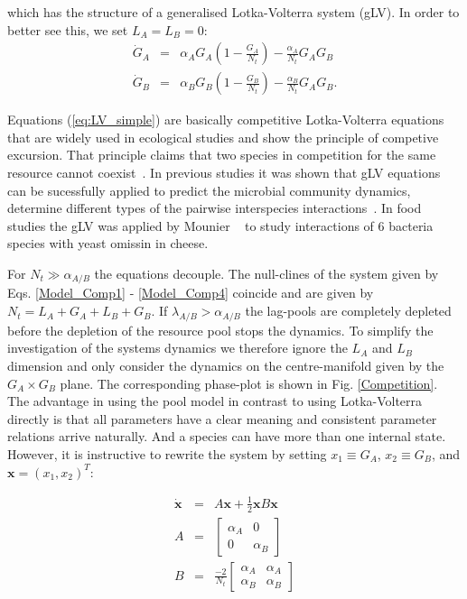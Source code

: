 \documentclass[10pt,A4paper]{article}
\begin{document}
which has the structure of a generalised Lotka-Volterra system (gLV). 
In order to better see this, we set $L_A=L_B=0$: 
\begin{eqnarray}
\label{Comp_Model}
\dot{G}_A &=& \alpha_A G_A\left(1 - \frac{G_A}{N_t}\right ) - \frac{\alpha_A}{N_t}G_AG_B\\
\dot{G}_B &=& \alpha_B G_B\left(1-\frac{G_B}{N_t}\right ) -\frac{\alpha_B}{N_t}G_AG_B. 
\label{eq:LV_simple}
\end{eqnarray} 

Equations (\ref{eq:LV_simple}) are basically competitive Lotka-Volterra equations that are widely used in ecological studies and show the principle of competive excursion.
That principle claims that two species in competition for the same resource cannot coexist~\cite{wangersky_lotka-volterra_1978}. 
In previous studies it was shown that gLV equations can be sucessfully applied to predict the microbial community dynamics, determine different types of the pairwise interspecies interactions~\cite{dedrick_when_2023, stein_ecological_2013, venturelli_deciphering_2018, hoffmann_power_2007}.
In food studies the gLV was applied by Mounier \etal~\cite{mounier_microbial_2008} to study interactions of 6 bacteria species  with yeast omissin in cheese.

For $N_t\gg\alpha_{A/B}$ the equations decouple. 
The null-clines of the system given by Eqs. \ref{Model_Comp1} - \ref{Model_Comp4} coincide and are given by $N_t=L_A+G_A+L_B+G_B$. 
If $\lambda_{A/B}>\alpha_{A/B}$ the lag-pools are completely depleted before the depletion of the resource pool stops the dynamics. 
To simplify the investigation of the systems dynamics we therefore ignore the $L_A$ and $L_B$ dimension and only consider the dynamics on the centre-manifold given by the $G_A\times G_B$ plane. 
The corresponding phase-plot is shown in Fig. \ref{Competition}. 
The advantage in using the pool model in contrast to using Lotka-Volterra directly is that all parameters have a clear meaning and consistent parameter relations arrive naturally. 
And a species can have more than one internal state. 
However, it is instructive to rewrite the system by setting $x_1\equiv G_A$, $x_2\equiv G_B$, and $\mathbf{x}=(x_1,x_2)^T$:

\begin{eqnarray}
\dot{\mathbf{x}}&=&A\mathbf{x}+\frac{1}{2}\mathbf{x}B\mathbf{x}\\
A&=&
\begin{bmatrix}
\alpha_A&0\\
0 &\alpha_B
\end{bmatrix}\\
B&=&
\frac{-2}{N_t}\begin{bmatrix}
\alpha_A&\alpha_A\\
\alpha_B &\alpha_B
\end{bmatrix}
\end{eqnarray}
\end{document}

